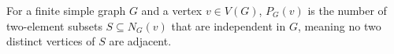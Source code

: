 \begin{definition}
For a finite simple graph $G$ and a vertex $v\in V(G)$, $P_G(v)$ is the
number of two-element subsets $S\subseteq N_G(v)$ that are independent in
$G$, meaning no two distinct vertices of $S$ are adjacent.
\end{definition}
